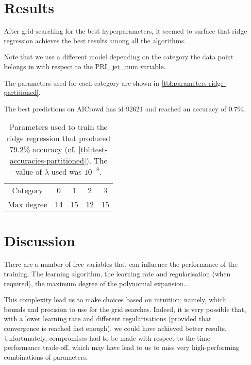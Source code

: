 \documentclass[10pt,conference,compsocconf]{IEEEtran}
\begin{document}
\section{Results}

After grid-searching for the best hyperparameters, it seemed to surface
that ridge regression achieves the best results among all the algorithms.

Note that we use a different model depending on the category the data
point belongs in with respect to the \textsf{PRI\_jet\_num} variable.

The parameters used for each category are shown in \autoref{tbl:parameters-ridge-partitioned}.

The best predictions on AICrowd has id 92621 and reached an accuracy of 0.794.

\begin{table}
  \centering
  \begin{tabular}{ |c|c|c|c|c| } 
    \hline 
    Category   & 0  & 1  & 2  & 3  \\
    Max degree & 14 & 15 & 12 & 15 \\
    \hline
  \end{tabular}
  \caption{Parameters used to train the ridge regression that produced 79.2\% accuracy (cf. \autoref{tbl:test-accuracies-partitioned}). The value of $\lambda$ used was $10^{-8}$.}
  \label{tbl:parameters-ridge-partitioned}
\end{table}

\section{Discussion}
There are a number of free variables that can influence the performance
of the training. The learning algorithm, the learning rate and regularisation
(when required), the maximum degree of the polynomial expansion...

This complexity lead us to make choices based on intuition; namely,
which bounds and precision to use for the grid searches.
Indeed, it is very possible that, with a lower learning rate and
different regularisations (provided that convergence is reached fast
enough), we could have achieved better results.
Unfortunately, compromises had to be made with respect to the 
time-performance trade-off, which may have lead to us to
miss very high-performing combinations of parameters.
\end{document}

